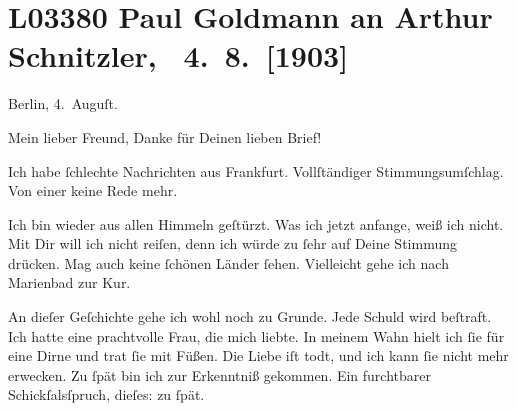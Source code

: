 

\section[ Paul Goldmann an Arthur Schnitzler, 4. 8. {[}1903{]}]{L03380 Paul Goldmann an Arthur Schnitzler,  4. 8. {[}1903{]}}
\nopagebreak{}
\rehead{ }\normalsize\beginnumbering{}
\toendnotes[C]{\smallbreak\pagebreak[2]}
\toendnotes[C]{\smallbreak}
\toendnotes[C]{\smallbreak}
\pstart
           \centering{}{\pb}Berlin, 4. Auguſt.\pend
           
\pstart{}Mein lieber Freund,\pend\vspace{0.5em}
\pstart
           Danke für Deinen lieben Brief!\pend
           
\pstart
           Ich habe{ }ſchlechte Nachrichten aus Frankfurt.
               Vollſtändiger Stimmungsumſchlag. Von einer \label{K_L03380-1v}\label{K_L03380-1} keine Rede mehr.\pend
           
\pstart
           Ich bin wieder aus allen Himmeln geſtürzt. Was ich jetzt anfange, weiß ich nicht. Mit
               Dir will ich nicht reiſen, denn ich würde zu{ }ſehr auf Deine Stimmung drücken. Mag
               auch keine{ }ſchönen Länder{ }ſehen. Vielleicht gehe ich nach Marienbad zur Kur.\pend
           
\pstart
           An dieſer Geſchichte gehe ich wohl noch zu Grunde. Jede Schuld wird beſtraft. Ich
               hatte eine prachtvolle Frau,
               die {\pb}mich liebte. In meinem Wahn hielt ich ſie für eine Dirne und trat{ }ſie mit Füßen. Die Liebe iſt todt, und ich kann{ }ſie nicht mehr erwecken. Zu{ }ſpät bin
               ich zur Erkenntniß gekommen. Ein furchtbarer Schickſalsſpruch, dieſes: zu{ }ſpät.\pend
           
